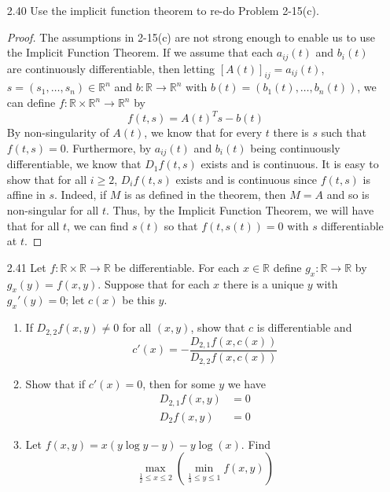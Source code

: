\begin{enumerate}
    \item[2.40] Use the implicit function theorem to re-do Problem 2-15(c).
    \begin{proof}
    The assumptions in 2-15(c) are not strong enough to enable us to use the Implicit Function Theorem. If we assume that each \( a_{ij}(t) \) and \( b_i(t) \) are continuously differentiable, then letting \( [A(t)]_{ij} = a_{ij}(t) \), \( s= (s_1,\ldots,s_n) \in \mathbb{R}^n \) and \( b: \mathbb{R} \rightarrow \mathbb{R}^n \) with \( b(t) = (b_1(t),\ldots,b_n(t)) \), we can define \( f: \mathbb{R}\times \mathbb{R}^n \rightarrow \mathbb{R}^n \) by
    \[
    f(t,s) = A(t)^Ts-b(t)
    \]
    By non-singularity of \( A(t) \), we know that for every \( t \) there is \( s \) such that \( f(t,s) = 0 \). Furthermore, by \( a_{ij}(t) \) and \( b_{i}(t) \) being continuously differentiable, we know that \( D_1f(t,s) \) exists and is continuous. It is easy to show that for all \( i \geq 2 \), \( D_{i}f(t,s) \) exists and is continuous since \( f(t,s) \) is affine in \( s \). Indeed, if \( M \) is as defined in the theorem, then \( M = A \) and so is non-singular for all \( t \). Thus, by the Implicit Function Theorem, we will have that for all \( t \), we can find \( s(t) \) so that \( f(t,s(t)) = 0 \) with \( s \) differentiable at \( t \). 
    \end{proof}
    
    \item[2.41] Let \( f: \mathbb{R} \times \mathbb{R} \rightarrow \mathbb{R} \) be differentiable. For each \( x \in \mathbb{R} \) define \( g_x: \mathbb{R} \rightarrow \mathbb{R} \) by \( g_x(y) = f(x,y) \). Suppose that for each \( x \) there is a unique \( y \) with \( g_x'(y) = 0 \); let \( c(x) \) be this \( y \).
    \begin{enumerate}
        \item If \( D_{2,2} f(x,y) \neq 0 \) for all \( (x,y) \), show that \( c \) is differentiable and
        \[
        c'(x) = -\frac{D_{2,1}f(x,c(x))}{D_{2,2}f(x,c(x))}
        \]
        
        \item Show that if \( c'(x) = 0 \), then for some \( y \) we have 
        \begin{align*}
            D_{2,1}f(x,y) &= 0 \\
            D_2f(x,y) &= 0
        \end{align*}
        
        \item Let \( f(x,y) = x(y \log y - y)-y \log(x) \). Find
        \[
        \max_{\frac{1}{2} \leq x \leq 2}\left( \min_{\frac{1}{3} \leq y \leq 1} f(x,y) \right)
        \]
    \end{enumerate}
    

\end{enumerate}
